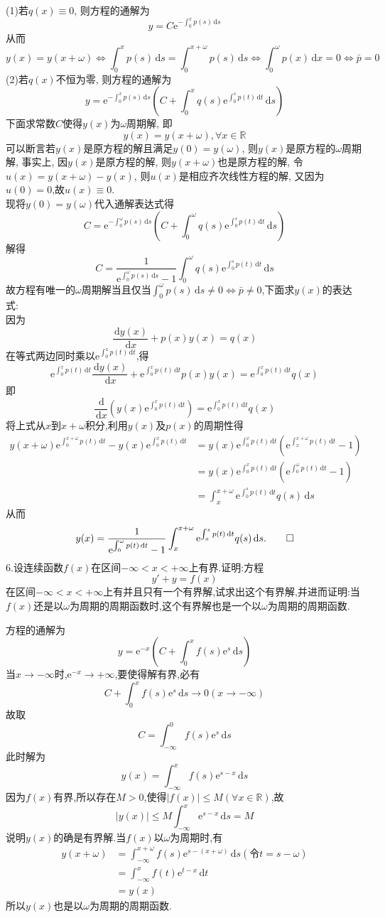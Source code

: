 \documentclass[titlepage,11pt,a4paper,twoside]{report}
\makeatletter
\newcommand\diff{\,\mathrm{d}}
\newcommand\e{\mathrm{e}}
\renewenvironment{proof}{\par
	\pushQED{\qed}%
	\normalfont \topsep1\p@\@plus6\p@\relax
	\trivlist
	\item\relax
	{\hspace*{\parindent}{\heiti 证明}\@addpunct{:}}\hspace\labelsep\ignorespaces
}{%
	\popQED\endtrivlist\@endpefalse
}
\makeatother
\begin{document}
\begin{proof}(1)若$q(x)\equiv0$, 则方程的通解为
\[y=C\e^{-\int_0^xp(s)\diff s}\]
从而\[y(x)=y(x+\omega)\Leftrightarrow\int_0^xp(s)\diff s=\int_0^{x+\omega}p(s)\diff s\Leftrightarrow\int_0^{\omega}p(x)\diff x=0\Leftrightarrow\bar{p}=0\]
(2)若$q(x)$不恒为零, 则方程的通解为
\[y=\e^{-\int_0^xp(s)\diff s}\left(C+\int_0^xq(s)\e^{\int_0^sp(t)\diff t}\diff s\right)\]
下面求常数$C$使得$y(x)$为$\omega$周期解, 即
\[y(x)=y(x+\omega),\forall x\in\mathbb{R}\]
可以断言若$y(x)$是原方程的解且满足$y(0)=y(\omega)$, 则$y(x)$是原方程的$\omega$周期解, 事实上, 因$y(x)$是原方程的解, 则$y(x+\omega)$也是原方程的解, 令$u(x)=y(x+\omega)-y(x)$, 则$u(x)$是相应齐次线性方程的解, 又因为$u(0)=0$,故$u(x)\equiv0$.\\
现将$y(0)=y(\omega)$代入通解表达式得
\[C=\e^{-\int_0^{\omega}p(s)\diff s}\left(C+\int_0^{\omega}q(s)\e^{\int_0^sp(t)\diff t}\diff s\right)\]
解得\[C=\frac{1}{\e^{\int_0^{\omega}p(s)\diff s}-1}\int_0^{\omega}q(s)\e^{\int_0^sp(t)\diff t}\diff s\]
故方程有唯一的$\omega$周期解当且仅当$\int_0^{\omega}p(s)\diff s\neq0\Leftrightarrow\bar{p}\neq0$,下面求$y(x)$的表达式:\\
因为\[\frac{\diff y(x)}{\diff x}+p(x)y(x)=q(x)\]
在等式两边同时乘以$\e^{\int_0^xp(t)\diff t}$,得
\[\e^{\int_0^xp(t)\diff t}\frac{\diff y(x)}{\diff x}+\e^{\int_0^xp(t)\diff t}p(x)y(x)=\e^{\int_0^xp(t)\diff t}q(x)\]
即\[\frac{\diff}{\diff x}\left(y(x)\e^{\int_0^xp(t)\diff t}\right)=\e^{\int_0^xp(t)\diff t}q(x)\]
将上式从$x$到$x+\omega$积分,利用$y(x)$及$p(x)$的周期性得
\[\begin{split}
y(x+\omega)\e^{\int_0^{x+\omega}p(t)\diff t}-y(x)\e^{\int_0^xp(t)\diff t}
&=y(x)\e^{\int_0^xp(t)\diff t}\left(\e^{\int_x^{x+\omega}p(t)\diff t}-1\right)\\
&=y(x)\e^{\int_0^xp(t)\diff t}\left(\e^{\int_0^{\omega}p(t)\diff t}-1\right)\\
&=\int_x^{x+\omega}\e^{\int_0^sp(t)\diff t}q(s)\diff s
\end{split}\]
从而\[y(x)=\frac{1}{\e^{\int_0^{\omega}p(t)\diff t}-1}\int_x^{x+\omega}\e^{\int_x^sp(t)\diff t}q(s)\diff s.\qedhere\]
\end{proof}
6.设连续函数$f(x)$在区间$-\infty<x<+\infty$上有界.证明:方程
\[y'+y=f(x)\]
在区间$-\infty<x<+\infty$上有并且只有一个有界解,试求出这个有界解,并进而证明:当$f(x)$还是以$\omega$为周期的周期函数时,这个有界解也是一个以$\omega$为周期的周期函数.
\begin{proof}方程的通解为
\[y=\e^{-x}\left(C+\int_0^xf(s)\e^s\diff s\right)\]
当$x\to-\infty$时,$\e^{-x}\to+\infty$,要使得解有界,必有
\[C+\int_0^xf(s)\e^s\diff s\to0(x\to-\infty)\]
故取\[C=\int_{-\infty}^0f(s)\e^s\diff s\]
此时解为\[y(x)=\int_{-\infty}^xf(s)\e^{s-x}\diff s\]
因为$f(x)$有界,所以存在$M>0$,使得$|f(x)|\leq M(\forall x\in\mathbb{R})$,故
\[|y(x)|\leq M\int_{-\infty}^x\e^{s-x}\diff s=M\]
说明$y(x)$的确是有界解.当$f(x)$以$\omega$为周期时,有
\[\begin{split}y(x+\omega)
&=\int_{-\infty}^{x+\omega}f(s)\e^{s-(x+\omega)}\diff s(令t=s-\omega)\\
&=\int_{-\infty}^xf(t)\e^{t-x}\diff t\\
&=y(x)\end{split}\]
所以$y(x)$也是以$\omega$为周期的周期函数.
\end{proof}
\end{document}
